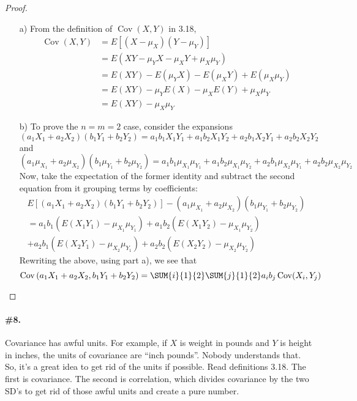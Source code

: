 \documentclass[12pt,titlepage]{article}
\DeclareMathOperator{\Cov}{Cov}
\begin{document}
\begin{proof}
\begin{enumerate}
\item[a)] From the definition of $\Cov(X,Y)$ in 3.18,
\begin{align*}
\Cov(X,Y) &= E\left[ (X-\mu_{X})(Y-\mu_{Y}) \right] \\
&= E( XY - \mu_{Y}X - \mu_{X}Y + \mu_{X} \mu_{Y} ) \\
&= E(XY) - E(\mu_{Y} X) - E(\mu_{X} Y) + E(\mu_{X} \mu_{Y}) \\
&= E(XY) -\mu_{Y} E(X) - \mu_{X} E(Y) + \mu_{X}\mu_{Y} \\
&= E(XY) - \mu_{X} \mu_{Y}
\end{align*}
\item[b)] To prove the $n=m=2$ case, consider the expansions
\[
(a_1 X_1 + a_2 X_2)(b_1 Y_1 + b_2 Y_2) = a_1 b_1 X_1 Y_1 + a_1 b_2 X_1 Y_2 + a_2 b_1 X_2 Y_1 + a_2 b_2 X_2 Y_2
\]
and
\[
(a_1 \mu_{X_1} + a_2 \mu_{X_2})(b_1 \mu_{Y_1} + b_2 \mu_{Y_2}) = a_1 b_1 \mu_{X_1} \mu_{Y_1} + a_1 b_2 \mu_{X_1} \mu_{Y_2} + a_2 b_1 \mu_{X_2} \mu_{Y_1} + a_2 b_2 \mu_{X_2} \mu_{Y_2}
\]
Now, take the expectation of the former identity and subtract the second equation from it grouping terms by coefficients:
\begin{multline*}
E\left[(a_1 X_1 + a_2 X_2)(b_1 Y_1 + b_2 Y_2)\right] - (a_1 \mu_{X_1} + a_2 \mu_{X_2})(b_1 \mu_{Y_1} + b_2 \mu_{Y_2}) \\
= a_1 b_1\left( E(X_1 Y_1) - \mu_{X_1} \mu_{Y_1} \right) 
+ a_1 b_2 \left( E(X_1 Y_2) - \mu_{X_1} \mu_{Y_2} \right) \\
+ a_2 b_1\left( E(X_2 Y_1) - \mu_{X_2} \mu_{Y_1} \right) + a_2 b_2 \left( E(X_2 Y_2) - \mu_{X_2} \mu_{Y_2} \right)
\end{multline*}
Rewriting the above, using part a), we see that
\[
\Cov\left( a_1 X_1 + a_2 X_2,b_1 Y_1 + b_2 Y_2 \right) = \SUM{i}{1}{2} \SUM{j}{1}{2} a_i b_j \Cov(X_i, Y_j)
\]
\end{enumerate}
\end{proof}



\paragraph{\#8.} Covariance has awful units. For example, if $X$ is weight in pounds and $Y$ is height in inches, the units of covariance are ``inch pounds''. Nobody understands that. So, it's a great idea to get rid of the units if possible. Read definitions 3.18. The first is covariance. The second is correlation, which divides covariance by the two SD's to get rid of those awful units and create a pure number. 
\end{document}
